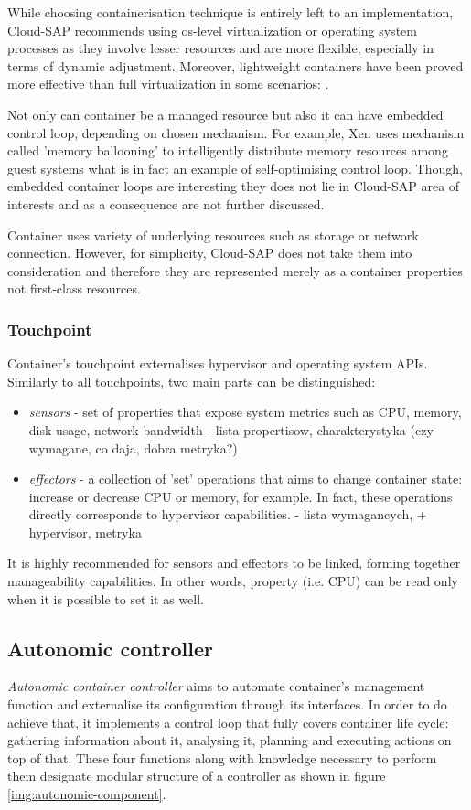 While choosing containerisation technique is entirely left to an implementation, Cloud-SAP recommends using os-level virtualization or operating system processes as they involve lesser resources and are more flexible, especially in terms of dynamic adjustment. Moreover, lightweight containers have been proved more effective than full virtualization in some scenarios: \cite{RaHiSj13}.

Not only can container be a managed resource but also it can have embedded control loop, depending on chosen mechanism. For example, Xen uses mechanism called 'memory ballooning' to intelligently distribute memory resources among guest systems what is in fact an example of self-optimising control loop. Though, embedded container loops are interesting they does not lie in Cloud-SAP area of interests and as a consequence are not further discussed.

Container uses variety of underlying resources such as storage or network connection. However, for simplicity, Cloud-SAP does not take them into consideration and therefore they are represented merely as a container properties not first-class resources.

\subsubsection{Touchpoint}
Container's touchpoint externalises hypervisor and operating system APIs. Similarly to all touchpoints, two main parts can be distinguished:
\begin{itemize}
 \item \emph{sensors} - set of properties that expose system metrics such as CPU, memory, disk usage, network bandwidth - lista propertisow, charakterystyka (czy wymagane, co daja, dobra metryka?)
 \item \emph{effectors} - a collection of 'set' operations that aims to change container state: increase or decrease CPU or memory, for example. In fact, these operations directly corresponds to hypervisor capabilities. - lista wymagancych, + hypervisor, metryka
\end{itemize}

It is highly recommended for sensors and effectors to be linked, forming together manageability capabilities. In other words, property (i.e. CPU) can be read only when it is possible to set it as well. 

\subsection{Autonomic controller}
\emph{Autonomic container controller} aims to automate container's management function and externalise its configuration through its interfaces. In order to do achieve that, it implements a control loop that fully covers container life cycle: gathering information about it, analysing it, planning and executing actions on top of that. These four functions along with knowledge necessary to perform them designate modular structure of a controller as shown in figure \ref{img:autonomic-component}.

